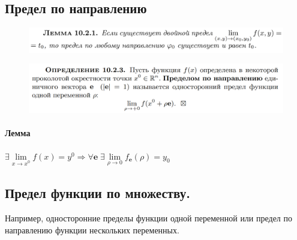 \documentclass{article}
\begin{document}
\subsection{Предел по направлению}
\begin{figure}[h!]
    \centering
    \vspace{-1cm}
\end{figure}
\begin{figure}[h!]
    \centering
    \includegraphics[width=\textwidth]{20.png}
    \vspace{-1cm}
\end{figure}
\begin{figure}[h!]
    \centering
    \includegraphics[width=\textwidth]{41.png}
    \vspace{-1cm}
\end{figure}
\paragraph*{Лемма} $\exists \lim\limits_{x\to x^0}f(x) = y^0 \Rightarrow \forall \mathbf{e} \; \exists \lim\limits_{\rho \to 0}f_{\mathbf{e}}(\rho)=y_0$

\newpage
\subsection{Предел функции по множеству.}
\begin{figure}[h!]
    \centering
\end{figure}
Например, односторонние пределы функции одной переменной или предел по направлению функции нескольких переменных.
\end{document}
